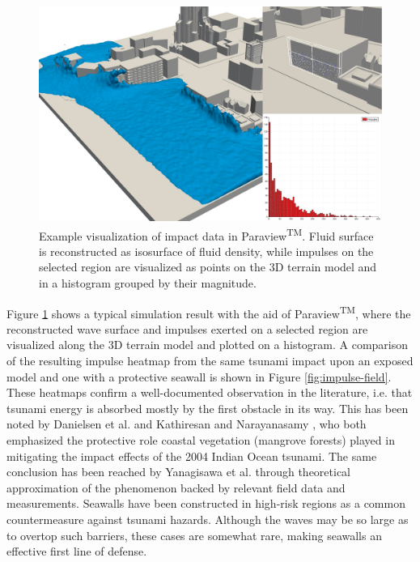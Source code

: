 \documentclass{llncs}
\begin{document}
\begin{figure}[h!]
  \includegraphics[width=\textwidth]{figures/paraview.png}
  \caption{Example visualization of impact data in Paraview\textsuperscript{TM}. Fluid
    surface is reconstructed as isosurface of fluid density, while impulses on the
    selected region are vi\-su\-a\-li\-zed as points on the 3D terrain model and in a
    histogram grouped by their magnitude.}
  \label{fig:visualization}
\end{figure}

Figure \ref{fig:visualization} shows a typical simulation result with the aid of
Paraview\textsuperscript{TM}, where the reconstructed wave surface and impulses exerted on
a selected region are visualized along the 3D terrain model and plotted on a histogram. A
comparison of the resulting impulse heatmap from the same tsunami impact upon an exposed
model and one with a protective seawall is shown in Figure \ref{fig:impulse-field}. These
heatmaps confirm a well-documented observation in the literature, i.e. that tsunami energy
is absorbed mostly by the first obstacle in its way. This has been noted by Danielsen et
al. \cite{danielsen2005asian} and Kathiresan and Narayanasamy \cite{kathiresan2005601},
who both emphasized the protective role coastal vegetation (mangrove forests) played in
mitigating the impact effects of the 2004 Indian Ocean tsunami. The same conclusion has
been reached by Yanagisawa et al. \cite{yanagisawa200927} through theoretical
approximation of the phenomenon backed by relevant field data and measurements. Seawalls
have been constructed in high-risk regions as a common countermeasure against tsunami
hazards. Although the waves may be so large as to overtop such barriers, these cases are
somewhat rare, making seawalls an effective first line of defense.
\end{document}
